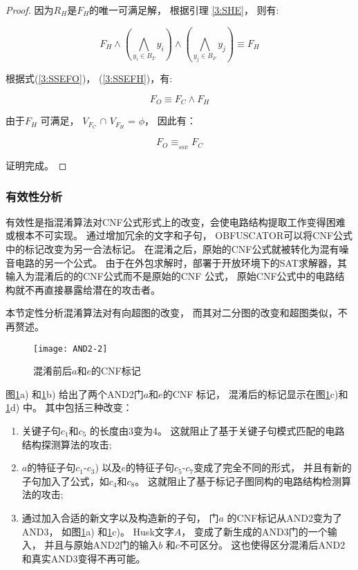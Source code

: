 \begin{proof}
因为${R_H}$是$F_H$的唯一可满足解，
根据引理 \ref{3:SHE}， 则有:

\begin{equation}\label{3:SSEFH}
F_H \wedge (\bigwedge_{y_i\in B_T}y_i)\wedge
(\bigwedge_{y_j\in B_F} y_j)\equiv F_H
\end{equation}

根据式(\ref{3:SSEFO})， (\ref{3:SSEFH})，有:

\begin{equation}\label{3:SSEEND}
F_O\equiv F_C \wedge F_H
\end{equation}

由于$F_H$ 可满足， $V_{F_C}$ $\cap$ $V_{F_H}$ = $\phi$， 因此有：

\begin{equation}
F_O\equiv_{_{SSE}}  F_C
\end{equation}

证明完成。
\end{proof}

\subsubsection{有效性分析}\label{3:effective}

有效性是指混淆算法对CNF公式形式上的改变，会使电路结构提取工作变得困难或根本不可实现。
通过增加冗余的文字和子句，
OBFUSCATOR可以将CNF公式中的标记改变为另一合法标记。
在混淆之后，原始的CNF公式就被转化为混有噪音电路的另一个公式。
由于在外包求解时，部署于开放环境下的SAT求解器，其输入为混淆后的的CNF公式而不是原始的CNF 公式，
原始CNF公式中的电路结构就不再直接暴露给潜在的攻击者。

本节定性分析混淆算法对有向超图的改变，
而其对二分图的改变和超图类似，不再赘述。

\begin{figure}[b]
\centering
\texttt{[image: AND2-2]}
\caption{混淆前后$a$和$e$的CNF标记}
\label{3:fig_beforeafter}
\end{figure}

图\ref{3:fig_beforeafter}a) 和\ref{3:fig_beforeafter}b) 给出了两个AND2门$a$和$e$的CNF 标记，
混淆后的标记显示在图\ref{3:fig_beforeafter}c)和\ref{3:fig_beforeafter}d) 中。
其中包括三种改变：
\begin{enumerate}
 \item
 关键子句$c_1$和$c_5$ 的长度由3变为4。
这就阻止了基于关键子句模式匹配的电路结构探测算法的攻击;
 \item
$a$的特征子句$c_1$-$c_3$) 以及$e$的特征子句$c_5$-$c_7$变成了完全不同的形式，
并且有新的子句加入了公式，如$c_4$和$c_8$。
这就阻止了基于标记子图同构的电路结构检测算法的攻击;
\item
 通过加入合适的新文字以及构造新的子句，
 门$a$ 的CNF标记从AND2变为了AND3，
如图\ref{3:fig_beforeafter}a) 和\ref{3:fig_beforeafter}c)。
Husk文字$A$，
变成了新生成的AND3门的一个输入，
并且与原始AND2门的输入$b$ 和$c$不可区分。
这也使得区分混淆后AND2和真实AND3变得不再可能。
\end{enumerate}

